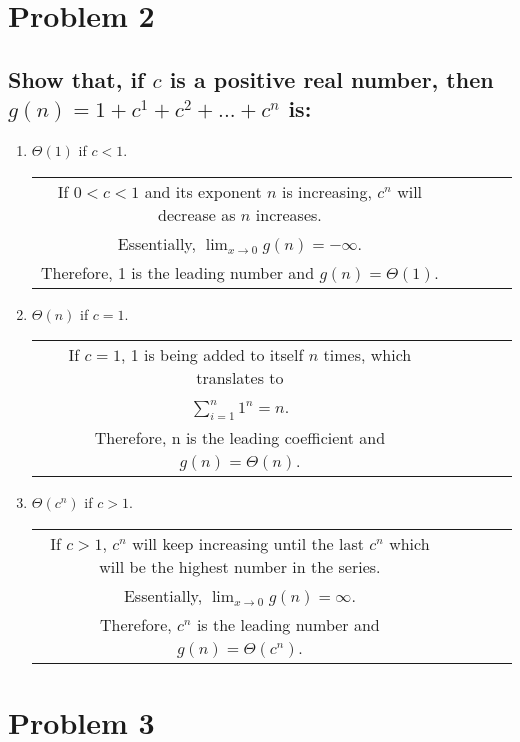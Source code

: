 \documentclass{article}
\begin{document}
\section*{Problem 2}
\subsection*{Show that, if $c$ is a positive real number, then $g(n)=1+c^1+c^2+...+c^{n}$ is:}
\begin{enumerate}[label=(\alph*)]
\item $\Theta(1)$ if $c<1$.
	\begin{center}
    	\begin{tabular}{c c c c c}
        	If $0<c<1$ and its exponent $n$ is increasing, $c^n$ will decrease as $n$ increases.\\
            Essentially, $ \lim_{x \to 0} g(n)=-\infty$.\\
            Therefore, 1 is the leading number and $g(n)=\Theta(1)$.\\
        \end{tabular}
	\end{center}
\item $\Theta(n)$ if $c=1$.
	\begin{center}
    	\begin{tabular}{c c c c c}
        	If $c=1$, 1 is being added to itself $n$ times, which translates to\\
            $\sum_{i=1}^{n} 1^{n}=n$.\\
            Therefore, n is the leading coefficient and $g(n)=\Theta(n)$.\\
        \end{tabular}
	\end{center}
\item $\Theta(c^n)$ if $c>1$.
\begin{center}
	\begin{tabular}{c c c c c}
    	If $c>1$, $c^n$ will keep increasing until the last $c^n$ which will be the highest number in the series.\\
        Essentially, $ \lim_{x \to 0} g(n)=\infty$.\\
        Therefore, $c^n$ is the leading number and $g(n)=\Theta(c^n)$.\\
	\end{tabular}
\end{center}
\end{enumerate}
\section*{Problem 3}
\end{document}

